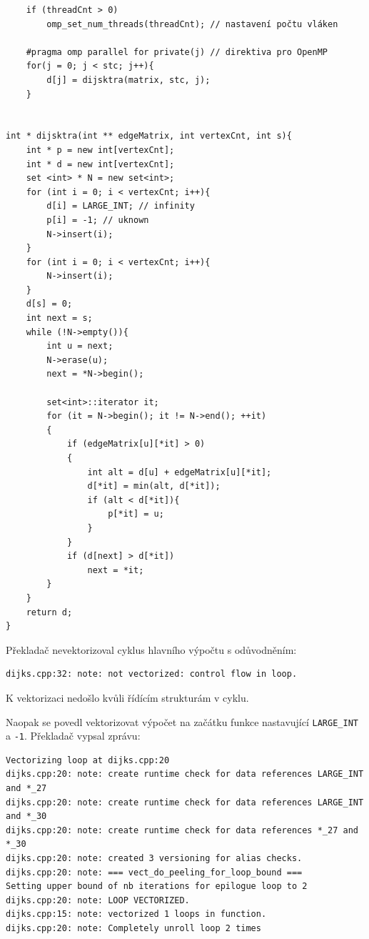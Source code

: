 \documentclass[a4paper,10pt]{article}
\begin{document}
\begin{verbatim}
    if (threadCnt > 0)
        omp_set_num_threads(threadCnt); // nastavení počtu vláken

    #pragma omp parallel for private(j) // direktiva pro OpenMP
    for(j = 0; j < stc; j++){
        d[j] = dijsktra(matrix, stc, j);
    }


int * dijsktra(int ** edgeMatrix, int vertexCnt, int s){
    int * p = new int[vertexCnt];
    int * d = new int[vertexCnt];
    set <int> * N = new set<int>;
    for (int i = 0; i < vertexCnt; i++){
        d[i] = LARGE_INT; // infinity
        p[i] = -1; // uknown
        N->insert(i);
    }
    for (int i = 0; i < vertexCnt; i++){
        N->insert(i);
    }   
    d[s] = 0;
    int next = s;
    while (!N->empty()){
        int u = next;
        N->erase(u);
        next = *N->begin();

        set<int>::iterator it;
        for (it = N->begin(); it != N->end(); ++it)
        {
            if (edgeMatrix[u][*it] > 0)
            {
                int alt = d[u] + edgeMatrix[u][*it];
                d[*it] = min(alt, d[*it]);
                if (alt < d[*it]){
                    p[*it] = u;
                }
            }
            if (d[next] > d[*it])
                next = *it;
        }
    }
    return d;
}
\end{verbatim}

Překladač nevektorizoval cyklus hlavního výpočtu s odůvodněním:
\begin{verbatim}
dijks.cpp:32: note: not vectorized: control flow in loop.
\end{verbatim}

K vektorizaci nedošlo kvůli řídícím strukturám v cyklu. 

Naopak se povedl vektorizovat výpočet na začátku funkce nastavující \texttt{LARGE\_INT} a \texttt{-1}. Překladač vypsal zprávu:

\begin{verbatim}
Vectorizing loop at dijks.cpp:20
dijks.cpp:20: note: create runtime check for data references LARGE_INT and *_27
dijks.cpp:20: note: create runtime check for data references LARGE_INT and *_30
dijks.cpp:20: note: create runtime check for data references *_27 and *_30
dijks.cpp:20: note: created 3 versioning for alias checks.
dijks.cpp:20: note: === vect_do_peeling_for_loop_bound ===
Setting upper bound of nb iterations for epilogue loop to 2
dijks.cpp:20: note: LOOP VECTORIZED.
dijks.cpp:15: note: vectorized 1 loops in function.
dijks.cpp:20: note: Completely unroll loop 2 times
\end{verbatim}
\end{document}
